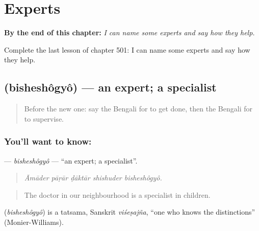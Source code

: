 
\chapter{Experts}
\label{ch:bn-experts}

\begin{chapteropening}
\textbf{By the end of this chapter:} \emph{I can name some experts and say how they help.}

Complete the last lesson of chapter 501: I can name some experts and say how they help.
\end{chapteropening}

\section[\texorpdfstring{\bn{বিশেষজ্ঞ} (bisheshôgyô)}{বিশেষজ্ঞ (bisheshôgyô)}]{ (bisheshôgyô) — an expert; a specialist}

\label{lesson:BN-C501-bisheshogyo}



\begin{quote}
Before the new one: say the Bengali for to get done, then the Bengali for to supervise.
\end{quote}

\subsection*{You'll want to know: }
\textbf{} — \emph{bisheshôgyô} — \textquotedblleft{}an expert; a specialist\textquotedblright{}.

\begin{quote}
    
\end{quote}

\begin{quote}
\emph{Āmāder pāṛār ḍāktār shishuder bisheshôgyô.}
\end{quote}

\begin{quote}
The doctor in our neighbourhood is a specialist in children.
\end{quote}

\begin{cousinweb}
\textbf{} (\emph{bisheshôgyô}) is a tatsama, Sanskrit \emph{viśeṣajña}, \textquotedblleft{}one who knows the distinctions\textquotedblright{} (Monier-Williams).
\end{cousinweb}

